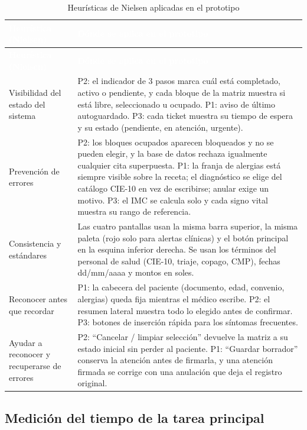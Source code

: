 \documentclass[11pt,a4paper]{article}
\newcommand{\cab}[1]{\textcolor{white}{\textbf{#1}}}
\begin{document}
\begin{xltabular}{\linewidth}{|P{5cm}|L|}
  \caption{Heurísticas de Nielsen aplicadas en el prototipo}\label{tab:heuristicas}\\
  \hline
  \cab{Heurística (Nielsen)} & \cab{Dónde se aplica en el prototipo} \\ \hline
  \endfirsthead
  \hline
  \cab{Heurística (Nielsen)} & \cab{Dónde se aplica en el prototipo} \\ \hline
  \endhead
  Visibilidad del estado del sistema &
    P2: el indicador de 3 pasos marca cuál está completado, activo o pendiente, y cada bloque
    de la matriz muestra si está libre, seleccionado u ocupado. P1: aviso de último autoguardado.
    P3: cada ticket muestra su tiempo de espera y su estado (pendiente, en atención,
    urgente). \\ \hline
  Prevención de errores &
    P2: los bloques ocupados aparecen bloqueados y no se pueden elegir, y la base de datos
    rechaza igualmente cualquier cita superpuesta. P1: la franja de alergias está siempre
    visible sobre la receta; el diagnóstico se elige del catálogo CIE-10 en vez de escribirse;
    anular exige un motivo. P3: el IMC se calcula solo y cada signo vital muestra su rango de
    referencia. \\ \hline
  Consistencia y estándares &
    Las cuatro pantallas usan la misma barra superior, la misma paleta (rojo solo para alertas
    clínicas) y el botón principal en la esquina inferior derecha. Se usan los términos del
    personal de salud (CIE-10, triaje, copago, CMP), fechas dd/mm/aaaa y montos en soles. \\ \hline
  Reconocer antes que recordar &
    P1: la cabecera del paciente (documento, edad, convenio, alergias) queda fija mientras el
    médico escribe. P2: el resumen lateral muestra todo lo elegido antes de confirmar.
    P3: botones de inserción rápida para los síntomas frecuentes. \\ \hline
  Ayudar a reconocer y recuperarse de errores &
    P2: ``Cancelar / limpiar selección'' devuelve la matriz a su estado inicial sin perder al
    paciente. P1: ``Guardar borrador'' conserva la atención antes de firmarla, y una atención
    firmada se corrige con una anulación que deja el registro original. \\ \hline
\end{xltabular}

\subsection{Medición del tiempo de la tarea principal}
\end{document}
